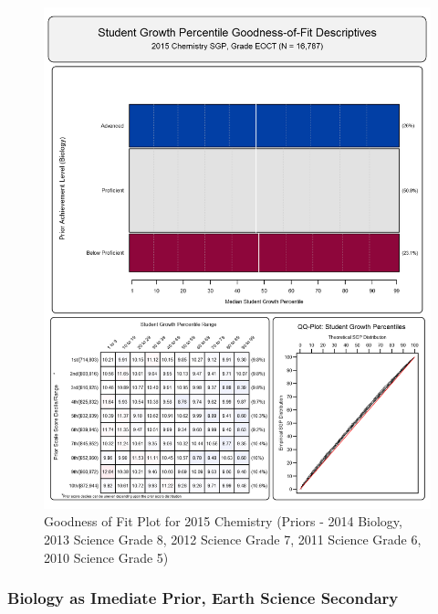 \documentclass[12pt]{article}
\begin{document}
\begin{figure}[htbp]
\centering
\includegraphics{../img/Goodness_of_Fit/CHEMISTRY.2015/2015_CHEMISTRY_EOCT;2014_BIOLOGY_EOCT;2013_SCIENCE_8;2012_SCIENCE_7;2011_SCIENCE_6;2010_SCIENCE_5.png}
\caption{Goodness of Fit Plot for 2015 Chemistry (Priors - 2014 Biology,
2013 Science Grade 8, 2012 Science Grade 7, 2011 Science Grade 6, 2010
Science Grade 5)}
\end{figure}

\clearpage 

\subsubsection{Biology as Imediate Prior, Earth Science
Secondary}\label{biology-as-imediate-prior-earth-science-secondary}
\end{document}

